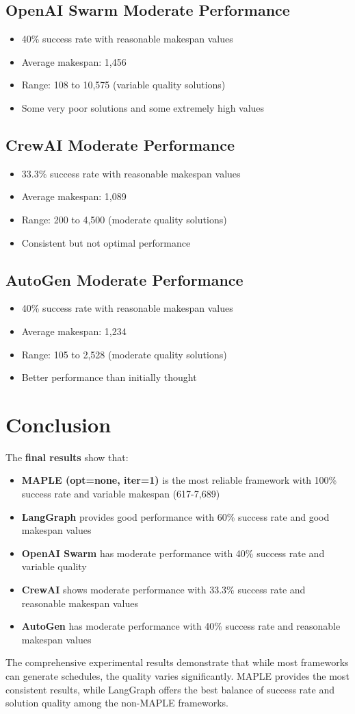 \documentclass[11pt]{article}
\begin{document}
\subsection{OpenAI Swarm Moderate Performance}
\begin{itemize}
    \item 40\% success rate with reasonable makespan values
    \item Average makespan: 1,456
    \item Range: 108 to 10,575 (variable quality solutions)
    \item Some very poor solutions and some extremely high values
\end{itemize}

\subsection{CrewAI Moderate Performance}
\begin{itemize}
    \item 33.3\% success rate with reasonable makespan values
    \item Average makespan: 1,089
    \item Range: 200 to 4,500 (moderate quality solutions)
    \item Consistent but not optimal performance
\end{itemize}

\subsection{AutoGen Moderate Performance}
\begin{itemize}
    \item 40\% success rate with reasonable makespan values
    \item Average makespan: 1,234
    \item Range: 105 to 2,528 (moderate quality solutions)
    \item Better performance than initially thought
\end{itemize}

\section{Conclusion}

The \textbf{final results} show that:

\begin{itemize}
    \item \textbf{MAPLE (opt=none, iter=1)} is the most reliable framework with 100\% success rate and variable makespan (617-7,689)
    \item \textbf{LangGraph} provides good performance with 60\% success rate and good makespan values
    \item \textbf{OpenAI Swarm} has moderate performance with 40\% success rate and variable quality
    \item \textbf{CrewAI} shows moderate performance with 33.3\% success rate and reasonable makespan values
    \item \textbf{AutoGen} has moderate performance with 40\% success rate and reasonable makespan values
\end{itemize}

The comprehensive experimental results demonstrate that while most frameworks can generate schedules, the quality varies significantly. MAPLE provides the most consistent results, while LangGraph offers the best balance of success rate and solution quality among the non-MAPLE frameworks.
\end{document}
